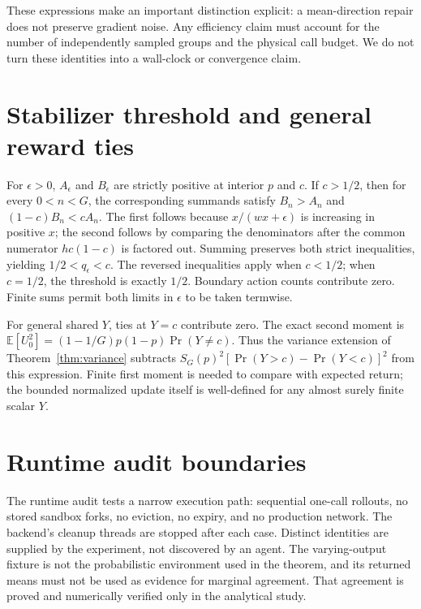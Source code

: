 \documentclass[10pt,letterpaper]{article}
\newcommand{\E}{\mathbb{E}}
\begin{document}
These expressions make an important distinction explicit: a mean-direction
repair does not preserve gradient noise. Any efficiency claim must account for
the number of independently sampled groups and the physical call budget.
We do not turn these identities into a wall-clock or convergence claim.

\section{Stabilizer threshold and general reward ties}
\label{app:epsilon}
For $\epsilon>0$, $A_\epsilon$ and $B_\epsilon$ are strictly positive at
interior $p$ and $c$. If $c>1/2$, then for every $0<n<G$, the corresponding
summands satisfy $B_n>A_n$ and $(1-c)B_n<cA_n$. The first follows because
$x/(w x+\epsilon)$ is increasing in positive $x$; the second follows by
comparing the denominators after the common numerator $h c(1-c)$ is factored
out. Summing preserves both strict inequalities, yielding
$1/2<q_\epsilon<c$. The reversed inequalities apply when $c<1/2$; when
$c=1/2$, the threshold is exactly $1/2$. Boundary action counts contribute zero.
Finite sums permit both limits in $\epsilon$ to be taken termwise.

For general shared $Y$, ties at $Y=c$ contribute zero. The exact second moment
is $\E[U_0^2]=(1-1/G)p(1-p)\Pr(Y\ne c)$. Thus the variance extension of
Theorem~\ref{thm:variance} subtracts
$S_G(p)^2[\Pr(Y>c)-\Pr(Y<c)]^2$ from this expression. Finite first moment is
needed to compare with expected return; the bounded normalized update itself
is well-defined for any almost surely finite scalar $Y$.

\section{Runtime audit boundaries}
The runtime audit tests a narrow execution path: sequential one-call rollouts,
no stored sandbox forks, no eviction, no expiry, and no production network.
The backend's cleanup threads are stopped after each case. Distinct identities
are supplied by the experiment, not discovered by an agent. The varying-output
fixture is not the probabilistic environment used in the theorem, and its
returned means must not be used as evidence for marginal agreement. That
agreement is proved and numerically verified only in the analytical study.
\end{document}
